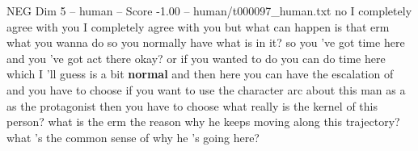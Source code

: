 \begin{textsample}{NEG Dim 5 – human – Score -1.00 – human/t000097\_human.txt}  \label{ex:f5_neg_040}
no I completely agree with you I completely agree with you but what can happen is that erm what you wanna do so you normally have what is in it? so you 've got time here and you 've got act there okay? or if you wanted to do you can do time here which I 'll guess is a bit \textbf{normal} and then here you can have the escalation of and you have to choose if you want to use the character arc about this man as a as the protagonist then you have to choose what really is the kernel of this person? what is the erm the reason why he keeps moving along this trajectory? what 's the common sense of why he 's going here?

\end{textsample}
